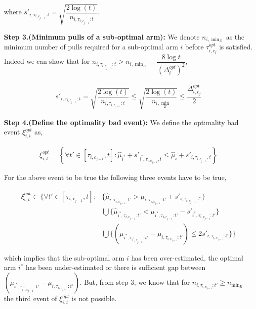 \begin{customproof}{2}
where $s'_{i,\tau_{i,c_{j-1}}:t} = \sqrt{\dfrac{2\log(t)}{n_{i,\tau_{i,c_{j-1}}:t}}}$. 


\textbf{Step 3.(Minimum pulls of a sub-optimal arm): } We denote $n_{i,\min_{E}}$ as the minimum number of pulls required for a sub-optimal arm $i$ before $\tau^{opt}_{i,c_j}$ is satisfied. Indeed we can show that for $n_{i,\tau_{i,c_{j-1}}:t}\geq n_{i,\min_{E}} = \dfrac{8\log t}{(\Delta^{opt}_{i})^2}$,

\begin{align*}
s'_{i,\tau_{i,c_{j-1}}:t} = \sqrt{\dfrac{2\log(t)}{n_{i,\tau_{i,c_{j-1}}:t}}} \leq \sqrt{\dfrac{2\log(t)}{n_{i,\min_{E}}}}\leq \dfrac{\Delta^{opt}_{i,c_j}}{2}
\end{align*}

\textbf{Step 4.(Define the optimality bad event):} We define the optimality bad event $\xi^{opt}_{i,t}$ as,

\begin{align*}
\xi^{opt}_{i,t} = \left\lbrace\forall t'\in [\tau_{i,c_{j-1}} , t]: \hat{\mu}_{i^*} + s'_{i^*,\tau_{i,c_{j-1}},t} \leq  \hat{\mu}_{i} + s'_{i,\tau_{i,c_{j-1}},t} \right\rbrace
\end{align*}

For the above event to be true the following three events have to be true,

\begin{align*}
\xi^{opt}_{i,t} \subset \bigg\lbrace\forall t'\in [\tau_{i,c_{j-1}} , t]: &\lbrace\hat{\mu}_{i,\tau_{i,c_{j-1}}:t'} > \mu_{i,\tau_{i,c_{j-1}}:t'} + s'_{i,\tau_{i,c_{j-1}}:t'}\rbrace \\
&\bigcup \lbrace\hat{\mu}_{i^*,\tau_{i,c_{j-1}}:t'} < \mu_{i^*,\tau_{i,c_{j-1}}:t'} - s'_{i^*,\tau_{i,c_{j-1}}:t'}\rbrace \\
&\bigcup \lbrace (\mu_{i^*,\tau_{i^*,c_{j-1}}:t'} - \mu_{i,\tau_{i,c_{j-1}}:t'}) \leq 2s'_{i,\tau_{i,c_{j-1}}:t'} \rbrace\bigg\rbrace
\end{align*}

which implies that the sub-optimal arm $i$ has been over-estimated, the optimal arm $i^*$ has been under-estimated or there is sufficient gap between $(\mu_{i^*,\tau_{i^*,c_{j-1}}:t'} - \mu_{i,\tau_{i,c_{j-1}}:t'})$. But, from step $3$, we know that for $n_{i,\tau_{i,c_{j-1}}:t'}\geq n_{\min_E}$ the third event of $\xi^{opt}_{i,t}$ is not possible.


\end{customproof}
